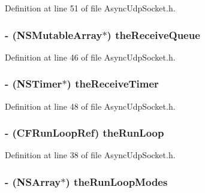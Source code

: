 Definition at line 51 of file AsyncUdpSocket.h.

\hypertarget{interface_async_udp_socket_a8461a181df1fb64915f467c9c0bc2798}{
\subsubsection[{theReceiveQueue}]{\setlength{\rightskip}{0pt plus 5cm}-\/ (NSMutableArray$\ast$) {\bf theReceiveQueue}}}
\label{interface_async_udp_socket_a8461a181df1fb64915f467c9c0bc2798}


Definition at line 46 of file AsyncUdpSocket.h.

\hypertarget{interface_async_udp_socket_abada5c7e39302439191504e9dac55532}{
\subsubsection[{theReceiveTimer}]{\setlength{\rightskip}{0pt plus 5cm}-\/ (NSTimer$\ast$) {\bf theReceiveTimer}}}
\label{interface_async_udp_socket_abada5c7e39302439191504e9dac55532}


Definition at line 48 of file AsyncUdpSocket.h.

\hypertarget{interface_async_udp_socket_a0df4eb574cfbcba161dc7589f8e9913e}{
\subsubsection[{theRunLoop}]{\setlength{\rightskip}{0pt plus 5cm}-\/ (CFRunLoopRef) {\bf theRunLoop}}}
\label{interface_async_udp_socket_a0df4eb574cfbcba161dc7589f8e9913e}


Definition at line 38 of file AsyncUdpSocket.h.

\hypertarget{interface_async_udp_socket_a12b4b7a67bd7a3c4a03a95117020aee4}{
\subsubsection[{theRunLoopModes}]{\setlength{\rightskip}{0pt plus 5cm}-\/ (NSArray$\ast$) {\bf theRunLoopModes}}}
\label{interface_async_udp_socket_a12b4b7a67bd7a3c4a03a95117020aee4}


